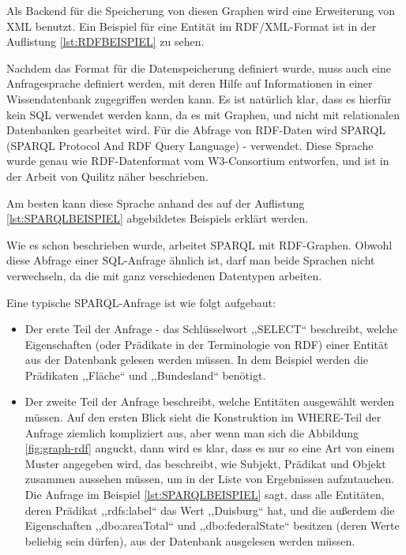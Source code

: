 Als Backend für die Speicherung von diesen Graphen wird eine Erweiterung von XML benutzt. Ein Beispiel für eine Entität im RDF/XML-Format ist in der Auflistung \ref{lst:RDFBEISPIEL} zu sehen.

\lstset{language=XML}


Nachdem das Format für die Datenspeicherung definiert wurde, muss auch eine Anfragesprache definiert werden, mit deren Hilfe auf Informationen in einer Wissendatenbank zugegriffen werden kann. Es ist natürlich klar, dass es hierfür kein SQL verwendet werden kann, da es mit Graphen, und nicht mit relationalen Datenbanken gearbeitet wird. Für die Abfrage von RDF-Daten wird SPARQL (SPARQL Protocol And RDF Query Language) - verwendet. Diese Sprache wurde genau wie RDF-Datenformat vom W3-Consortium entworfen, und ist in der Arbeit von Quilitz\cite{quilitz2008querying} näher beschrieben.

Am besten kann diese Sprache anhand des auf der Auflistung \ref{lst:SPARQLBEISPIEL} abgebildetes Beispiels erklärt werden.
\lstset{language=SPARQL}


Wie es schon beschrieben wurde, arbeitet SPARQL mit RDF-Graphen. Obwohl diese Abfrage einer SQL-Anfrage ähnlich ist, darf man beide Sprachen nicht verwechseln, da die mit ganz verschiedenen Datentypen arbeiten. 

Eine typische SPARQL-Anfrage ist wie folgt aufgebaut:
\begin{itemize}
\item Der erste Teil der Anfrage - das Schlüsselwort ,,SELECT`` beschreibt, welche Eigenschaften (oder Prädikate in der Terminologie von RDF) einer Entität aus der Datenbank gelesen werden müssen. In dem Beispiel werden die Prädikaten ,,Fläche`` und ,,Bundesland`` benötigt.
\item Der zweite Teil der Anfrage beschreibt, welche Entitäten ausgewählt werden müssen. Auf den ersten Blick sieht die Konstruktion im WHERE-Teil der Anfrage ziemlich kompliziert aus, aber wenn man sich die Abbildung \ref{fig:graph-rdf} anguckt, dann wird es klar, dass es nur so eine Art von einem Muster angegeben wird, das beschreibt, wie Subjekt, Prädikat und Objekt zusammen aussehen müssen, um in der Liste von Ergebnissen aufzutauchen. Die Anfrage im Beispiel \ref{lst:SPARQLBEISPIEL} sagt, dass alle Entitäten, deren Prädikat ,,rdfs:label`` das Wert ,,Duisburg`` hat, und die  außerdem die Eigenschaften ,,dbo:areaTotal`` und ,,dbo:federalState`` besitzen (deren Werte beliebig sein dürfen), aus der Datenbank ausgelesen werden müssen.
\end{itemize}

